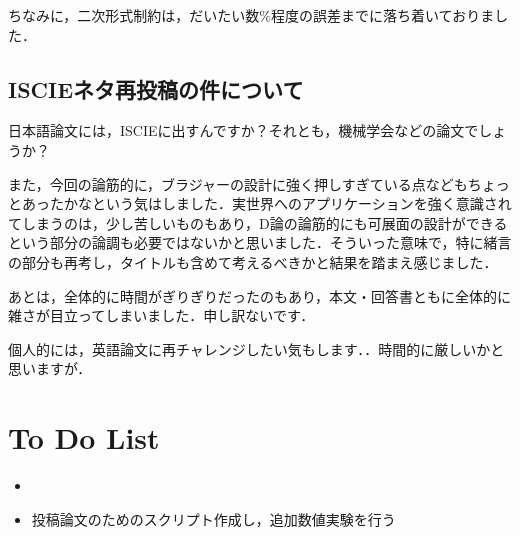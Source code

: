 \documentclass[11pt]{jsarticle}
\begin{document}
			ちなみに，二次形式制約は，だいたい数$ \% $程度の誤差までに落ち着いておりました．
		\subsection{ISCIEネタ再投稿の件について}
			日本語論文には，ISCIEに出すんですか？それとも，機械学会などの論文でしょうか？
			
			また，今回の論筋的に，ブラジャーの設計に強く押しすぎている点などもちょっとあったかなという気はしました．実世界へのアプリケーションを強く意識されてしまうのは，少し苦しいものもあり，D論の論筋的にも可展面の設計ができるという部分の論調も必要ではないかと思いました．そういった意味で，特に緒言の部分も再考し，タイトルも含めて考えるべきかと結果を踏まえ感じました．
			
			あとは，全体的に時間がぎりぎりだったのもあり，本文・回答書ともに全体的に雑さが目立ってしまいました．申し訳ないです．
			
			個人的には，英語論文に再チャレンジしたい気もします．．時間的に厳しいかと思いますが．
	\section{To Do List}
		\begin{itemize}
			\item 
			\item 投稿論文のためのスクリプト作成し，追加数値実験を行う
		\end{itemize}
				
	\newpage
\vspace{10cm}
	

\vspace{14cm}
	\articleSPRfour
	\articleSPRfive
\end{document}
